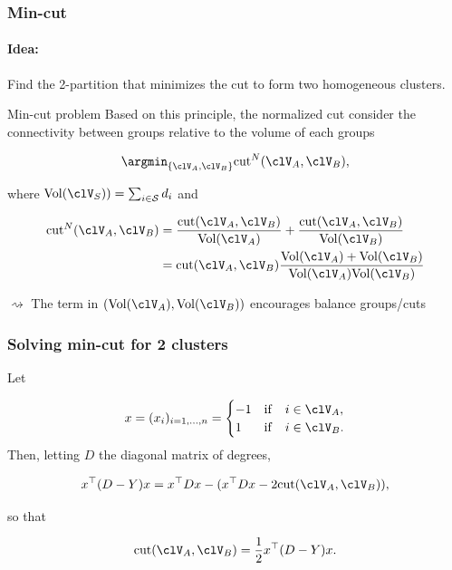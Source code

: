 \documentclass{beamer}\usepackage[]{graphicx}\usepackage[]{color}
\begin{document}
\begin{frame}
  \frametitle{Min-cut}
  
  \paragraph{Idea:} Find the 2-partition that minimizes the cut to form two homogeneous clusters.

  \begin{block}{Min-cut problem}
  Based on this principle, the normalized cut consider the connectivity between groups relative to the volume of each groups

$$\argmin_{\{\clV_A, \clV_B\}} \mathrm{cut}^{N}(\clV_A, \clV_B),$$

where $\mathrm{Vol}(\clV_S)) = \sum_{i\in\mathcal{S}} d_i$ and

$$
\begin{aligned}
\mathrm{cut}^{N}(\clV_A, \clV_B) & = \frac{\mathrm{cut}(\clV_A, \clV_B)}{\mathrm{Vol}(\clV_A)} + \frac{\mathrm{cut}(\clV_A, \clV_B)}{\mathrm{Vol}(\clV_B)} \\
 & =  \mathrm{cut}(\clV_A, \clV_B)\frac{\mathrm{Vol}(\clV_A) + \mathrm{Vol}(\clV_B)}{\mathrm{Vol}(\clV_A)\mathrm{Vol}(\clV_B)} \\
\end{aligned}
$$
  \end{block}

$\rightsquigarrow$ The term in $(\mathrm{Vol}(\clV_A) ,\mathrm{Vol}(\clV_B))$ encourages balance groups/cuts

\end{frame}

\begin{frame}
  \frametitle{Solving min-cut for 2 clusters}
  
Let 

$$
x = (x_i)_{i=1,\dots,n} = 
\begin{cases}
-1 & \mathrm{if} \quad  i\in \clV_A, \\
 1 & \mathrm{if} \quad  i\in \clV_B. \\
\end{cases}
$$
Then, letting $D$ the diagonal matrix of degrees, 

$$
x^\top (D - Y) x = x^\top D x - ( x^\top D x - 2 \mathrm{cut} (\clV_A, \clV_B)),
$$

so that 

$$
\mathrm{cut} (\clV_A, \clV_B) = \frac12 x^\top (D - Y) x.
$$

\end{frame}
\end{document}
